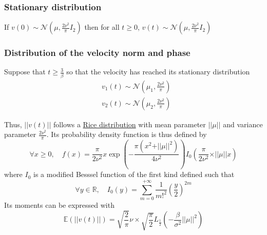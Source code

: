 \documentclass[11pt]{article}
\newcommand {\R}{\mathbb{R}}
\newcommand {\E}{\mathbb{E}}
\newcommand {\1}{\mathbb{1}}
\begin{document}
\subsubsection{Stationary distribution}

If $v(0) \sim \mathcal{N}\left(\mu,\frac{2\nu^2}{\pi} I_2\right)$ then for all $t \geq 0$, $v(t) \sim \mathcal{N}\left(\mu,\frac{2\nu^2}{\pi} I_2\right)$

\subsubsection{Distribution of the velocity norm and phase}

Suppose that $t\geq \frac{3}{\beta}$ so that the velocity has reached its stationary distribution
\begin{align*}
	&v_1(t) \sim \mathcal{N}\left(\mu_1, \frac{2\nu^2}{\pi}\right) \\
	&v_2(t) \sim \mathcal{N}\left(\mu_2, \frac{2\nu^2}{\pi}\right)
\end{align*}

\begin{figure}[H]
	\centering
\end{figure}
Thus, $ \vert \vert v(t) \vert \vert$ follows a \href{https://en.wikipedia.org/wiki/Rice_distribution}{Rice distribution} with mean parameter $\vert \vert \mu \vert \vert$ and variance parameter $\frac{2\nu^2}{\pi}$. Its probability density function is thus defined by
\[\forall x \geq 0, \quad f(x)= \frac{\pi}{2\nu^2}x \exp\left(-\frac{\pi (x^2+ \vert \vert \mu \vert \vert^2)}{4\nu^2}\right) I_{0}\left(   \frac{\pi}{2\nu^2}\times \vert \vert \mu \vert \vert x \right)\]
where $I_0$ is a modified Besssel function of the first kind defined such that 
\[\forall y  \in \R, \quad I_0(y)=\sum_{m=0}^{+\infty} \frac{1}{m!^2}\left(\frac{y}{2}\right)^{2m}\]
Its moments can be expressed with
\[\E\left(\vert \vert v(t) \vert \vert\right)=\sqrt{\frac{2}{\pi}}\nu \times \sqrt{\frac{\pi}{2}} L_{\frac{1}{2}} \left( -\frac{\beta}{\sigma^2} \vert \vert \mu \vert \vert ^2 \right)\]
\end{document}
